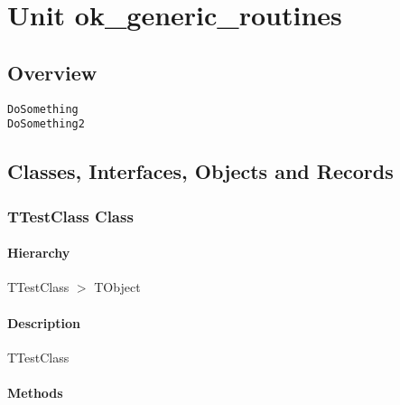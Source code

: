 \documentclass{report}
\newif\ifpdf
\begin{document}
\label{toc}\tableofcontents
\newpage
\newlength{\tmplength}
\chapter{Unit ok{\_}generic{\_}routines}
\label{ok_generic_routines}
\section{Overview}
\begin{description}
\item[\texttt{\begin{ttfamily}TTestClass\end{ttfamily} Class}]
\end{description}
\begin{description}
\item[\texttt{DoSomething}]
\item[\texttt{DoSomething2}]
\end{description}
\section{Classes, Interfaces, Objects and Records}
\ifpdf
\subsection*{\large{\textbf{TTestClass Class}}\normalsize\hspace{1ex}\hrulefill}
\else
\subsection*{TTestClass Class}
\fi
\label{ok_generic_routines.TTestClass}
\subsubsection*{\large{\textbf{Hierarchy}}\normalsize\hspace{1ex}\hfill}
TTestClass {$>$} TObject
\subsubsection*{\large{\textbf{Description}}\normalsize\hspace{1ex}\hfill}
TTestClass\subsubsection*{\large{\textbf{Methods}}\normalsize\hspace{1ex}\hfill}
\end{document}
